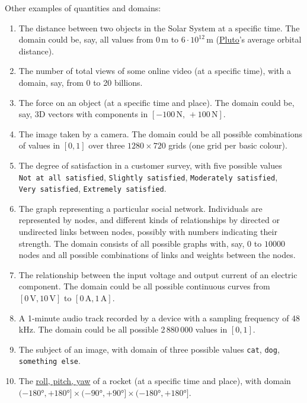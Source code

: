 \documentclass[
  a4paper,
  DIV=11,
  numbers=noendperiod,
  oneside]{scrreprt}
\begin{document}
Other examples of quantities and domains:

\begin{enumerate}
\def\labelenumi{\arabic{enumi}.}
\item
  The distance between two objects in the Solar System at a specific
  time. The domain could be, say, all values from \(0\,\mathrm{m}\) to
  \(6\cdot10^{12}\,\mathrm{m}\)
  (\href{https://solarsystem.nasa.gov/planets/dwarf-planets/pluto}{Pluto}'s
  average orbital distance).
\item
  The number of total views of some online video (at a specific time),
  with a domain, say, from 0 to 20 billions.
\item
  The force on an object (at a specific time and place). The domain
  could be, say, 3D vectors with components in
  \([-100\,\mathrm{N},\,+100\,\mathrm{N}]\).
\item
  The image taken by a camera. The domain could be all possible
  combinations of values in \([0,1]\) over three \(1280\times 720\)
  grids (one grid per basic colour).
\item
  The degree of satisfaction in a customer survey, with five possible
  values \texttt{Not\ at\ all\ satisfied}, \texttt{Slightly\ satisfied},
  \texttt{Moderately\ satisfied}, \texttt{Very\ satisfied},
  \texttt{Extremely\ satisfied}.
\item
  The graph representing a particular social network. Individuals are
  represented by nodes, and different kinds of relationships by directed
  or undirected links between nodes, possibly with numbers indicating
  their strength. The domain consists of all possible graphs with, say,
  \(0\) to \(10000\) nodes and all possible combinations of links and
  weights between the nodes.
\item
  The relationship between the input voltage and output current of an
  electric component. The domain could be all possible continuous curves
  from \([0\,\mathrm{V}, 10\,\mathrm{V}]\) to
  \([0\,\mathrm{A}, 1\,\mathrm{A}]\).
\item
  A 1-minute audio track recorded by a device with a sampling frequency
  of 48\,kHz. The domain could be all possible 2\,880\,000 values in
  \([0,1]\).
\item
  The subject of an image, with domain of three possible values
  \texttt{cat}, \texttt{dog}, \texttt{something\ else}.
\item
  The
  \href{https://www.grc.nasa.gov/www/k-12/rocket/rotations.html}{roll,
  pitch, yaw} of a rocket (at a specific time and place), with domain
  \((-180°,+180°]\times(-90°,+90°]\times(-180°,+180°]\).
\end{enumerate}
\end{document}
